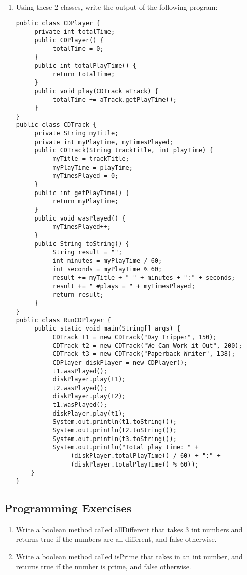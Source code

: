 \begin{enumerate}[label={\arabic{counter}\addtocounter{counter}{1}}.]
\item Using these 2 classes, write the output of the following program:
\begin{lstlisting}
public class CDPlayer {
     private int totalTime;
     public CDPlayer() {
          totalTime = 0;
     }
     public int totalPlayTime() {
          return totalTime;
     }
     public void play(CDTrack aTrack) {
          totalTime += aTrack.getPlayTime();
     }
}
public class CDTrack {
     private String myTitle;
     private int myPlayTime, myTimesPlayed;
     public CDTrack(String trackTitle, int playTime) {
          myTitle = trackTitle;
          myPlayTime = playTime;
          myTimesPlayed = 0;
     }
     public int getPlayTime() {
          return myPlayTime;
     }
     public void wasPlayed() {
          myTimesPlayed++;
     }
     public String toString() {
          String result = "";
          int minutes = myPlayTime / 60;
          int seconds = myPlayTime % 60;
          result += myTitle + " " + minutes + ":" + seconds;
          result += " #plays = " + myTimesPlayed;
          return result;
     }
}
public class RunCDPlayer {
     public static void main(String[] args) {
          CDTrack t1 = new CDTrack("Day Tripper", 150);
          CDTrack t2 = new CDTrack("We Can Work it Out", 200);
          CDTrack t3 = new CDTrack("Paperback Writer", 138);
          CDPlayer diskPlayer = new CDPlayer();
          t1.wasPlayed();
          diskPlayer.play(t1);
          t2.wasPlayed();
          diskPlayer.play(t2);
          t1.wasPlayed();
          diskPlayer.play(t1);
          System.out.println(t1.toString());
          System.out.println(t2.toString());
          System.out.println(t3.toString());
          System.out.println("Total play time: " + 
               (diskPlayer.totalPlayTime() / 60) + ":" + 
               (diskPlayer.totalPlayTime() % 60));
	}
}
\end{lstlisting}

\end{enumerate}

\subsection{Programming Exercises}

\setcounter{counter}{1}
\begin{enumerate}[label={\arabic{counter}\addtocounter{counter}{1}}.]

\item Write a boolean method called allDifferent that takes 3 int numbers and returns true if the numbers are all different, and false otherwise.

\item Write a boolean method called isPrime that takes in an int number, and returns true if the number is prime, and false otherwise.

\end{enumerate}